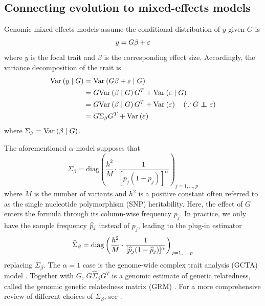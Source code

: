 \documentclass[10pt]{article}
\begin{document}
\subsection{Connecting evolution to mixed-effects models}
Genomic mixed-effects models assume the conditional distribution of $y$ given $G$ is 
\begin{align}
    y = G\beta + {{\varepsilon}} 
\end{align}
where $y$ is the focal trait and $\beta$ is the corresponding effect size.
Accordingly, the variance decomposition of the trait is
\begin{align}
    \begin{aligned}
    \var{y \mid G} &= \var{G\beta + \veps \mid G} \\
    &= G\var{\beta \mid G}G^T + \var{\veps \mid G} \\
    &= G\var{\beta \mid G}G^T + \var{\veps} 
    \quad
    (\because G \indep \veps) \\
    &= G \Sigma_\beta G^T + \var{\veps}
    \end{aligned}
\end{align}
where $\Sigma_\beta = \mathrm{Var}_{}\left(\beta \mid G\right)$.

The aforementioned $\alpha$-model supposes that
\begin{equation}
    \label{eq:Sigma_beta}
    \Sigma_\beta = \textrm{diag}
    \left( 
    \frac{h^2}{M} \cdot \frac{1}{[p_j(1-p_j)]^\alpha}
    \right)_{j=1,\ldots,p}
\end{equation}
where $M$ is the number of variants and $h^2$ is a positive constant often referred to as the single nucleotide polymorphism (SNP) heritability.
Here, the effect of $G$ enters the formula through its column-wise frequency $p_j$. In practice, we only have the sample frequency $\widehat{p}_j$ instead of $p_j$, leading to the plug-in estimator
\begin{align} \label{eq:alpha}
    \begin{aligned}
        \widehat{\Sigma}_{\beta} = \textrm{diag}
        \left( 
        \frac{h^2}{M } \cdot \frac{1}{[\widehat{p}_j(1-\widehat{p}_j)]^\alpha}
        \right)_{j=1,\ldots,p} 
    \end{aligned}
\end{align}
replacing $\Sigma_\beta$.
The $\alpha=1$ case is the genome-wide complex trait analysis (GCTA) model \citep{Yang_2011}.
Together with $G$, $G \widehat{\Sigma}_{\beta}G^T$ is a genomic estimate of genetic relatedness, called the genomic genetic relatedness matrix (GRM) \citep{Speed_2014}.
For a more comprehensive review of different choices of $\Sigma_\beta$, see \citet{Lehmann_2025, Weir_2026}.
\end{document}

